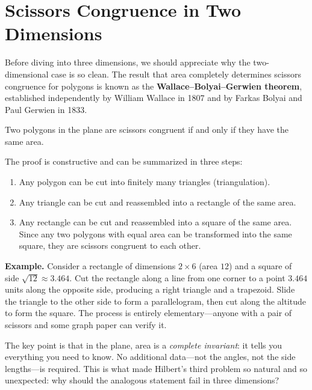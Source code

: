 \section{Scissors Congruence in Two Dimensions}

Before diving into three dimensions, we should appreciate why the two-dimensional case is so clean. The result that area completely determines scissors congruence for polygons is known as the \textbf{Wallace--Bolyai--Gerwien theorem}, established independently by William Wallace in 1807 and by Farkas Bolyai and Paul Gerwien in 1833.

\begin{theorem}
Two polygons in the plane are scissors congruent if and only if they have the same area.
\end{theorem}

The proof is constructive and can be summarized in three steps:

\begin{enumerate}
    \item Any polygon can be cut into finitely many triangles (triangulation).
    \item Any triangle can be cut and reassembled into a rectangle of the same area.
    \item Any rectangle can be cut and reassembled into a square of the same area. Since any two polygons with equal area can be transformed into the same square, they are scissors congruent to each other.
\end{enumerate}

\vspace{0.25em}
\noindent \textbf{Example.} Consider a rectangle of dimensions $2 \times 6$ (area $12$) and a square of side $\sqrt{12} \approx 3.464$. Cut the rectangle along a line from one corner to a point $3.464$ units along the opposite side, producing a right triangle and a trapezoid. Slide the triangle to the other side to form a parallelogram, then cut along the altitude to form the square. The process is entirely elementary---anyone with a pair of scissors and some graph paper can verify it.

The key point is that in the plane, area is a \emph{complete invariant}: it tells you everything you need to know. No additional data---not the angles, not the side lengths---is required. This is what made Hilbert's third problem so natural and so unexpected: why should the analogous statement fail in three dimensions?


